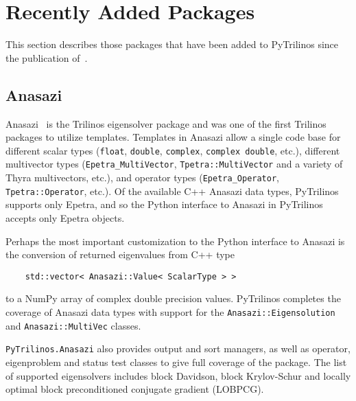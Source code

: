 \documentclass[11pt]{article}
\begin{document}
\section{Recently Added Packages}
\label{sec:newpackages}

This section describes those packages that have been added to PyTrilinos since the publication of~\cite{PyTrilinos}.

\subsection{Anasazi}
\label{sec:anasazi}

Anasazi~\cite{Anasazi} is the Trilinos eigensolver package and was one of the first Trilinos packages to utilize templates.  Templates in Anasazi allow a single code base for different scalar types ({\tt float}, {\tt double}, {\tt complex}, {\tt complex double}, etc.), different multivector types ({\tt Epetra\_MultiVector}, {\tt Tpetra::MultiVector} and a variety of Thyra multivectors, etc.), and operator types ({\tt Epetra\_Operator}, {\tt Tpetra::Operator}, etc.).  Of the available C++ Anasazi data types, PyTrilinos supports only Epetra, and so the Python interface to Anasazi in PyTrilinos accepts only Epetra objects.

Perhaps the most important customization to the Python interface to Anasazi is the conversion of returned eigenvalues from C++ type
\begin{verbatim}
    std::vector< Anasazi::Value< ScalarType > >
\end{verbatim}
to a NumPy array of complex double precision values.  PyTrilinos completes the coverage of Anasazi data types with support for the {\tt Anasazi::Eigensolution} and {\tt Anasazi::MultiVec} classes.

{\tt PyTrilinos.Anasazi} also provides output and sort managers, as well as operator, eigenproblem and status test classes to give full coverage of the package.  The list of supported eigensolvers includes block Davidson, block Krylov-Schur and locally optimal block preconditioned conjugate gradient (LOBPCG).
\end{document}
